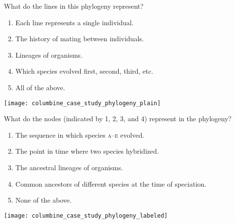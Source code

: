 \documentclass[t,handout]{beamer}  %
\newcommand{\ques}[1]{\highlight{\textsc{q#1:}}}
\begin{document}
%
\begin{frame}[t]{\ques2 What do the lines in this phylogeny represent?}

	\begin{multicols}{2}
	\begin{enumerate}

		\item Each line represents a single individual.

		\item The history of mating between individuals.

		\item \alert<2>{Lineages of organisms.}

		\item Which species evolved first, second, third, etc.

		\item All of the above. 

	\end{enumerate}

	\columnbreak
	
	\hfill \texttt{[image: columbine\_case\_study\_phylogeny\_plain]}
	\end{multicols}
\end{frame}
%
\begin{frame}[t]{\ques3 What do the nodes (indicated by 1, 2, 3, and 4) represent in the phylogeny?}

	\begin{multicols}{2}
	\begin{enumerate}

		\item The sequence in which species \textsc{a}–\textsc{e} evolved.
		
		\item The point in time where two species hybridized.
		
		\item The ancestral lineages of organisms.
		
		\item \alert<2>{Common ancestors of different species at the time of speciation.}
		
		\item None of the above.

	\end{enumerate}

	\columnbreak
	
	\hfill \texttt{[image: columbine\_case\_study\_phylogeny\_labeled]}
		
	\end{multicols}
\end{frame}
\end{document}
